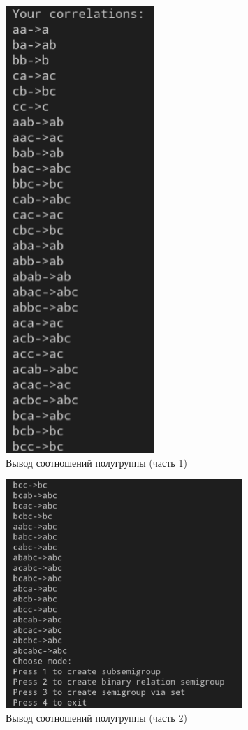 \documentclass[bachelor, och, labwork]{shiza}
\begin{document}
      \begin{figure}[H]
        \centering
        \includegraphics[width=0.5\textwidth]{photo/4.png}
        \caption{Вывод соотношений полугруппы (часть 1)}
      \end{figure}

      \begin{figure}[H]
        \centering
        \includegraphics[width=0.8\textwidth]{photo/5.png}
        \caption{Вывод соотношений полугруппы (часть 2)}
      \end{figure}
\end{document}
